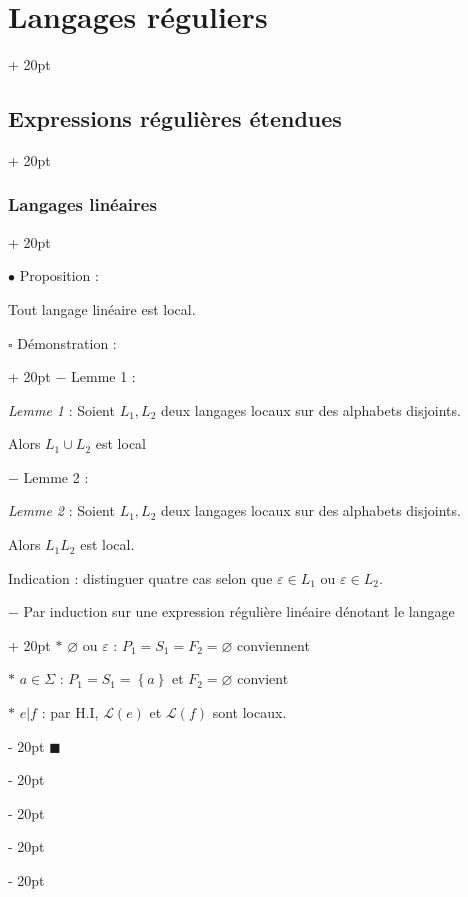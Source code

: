 \documentclass[a4paper, 12pt, twoside]{article}
\newcommand{\set}[1]{\left\{ #1 \right\}}
\newcommand{\ind}[1][20pt]{\advance\leftskip + #1}
\newcommand{\deind}[1][20pt]{\advance\leftskip - #1}
\newenvironment{indt}[2][20pt]{#2 \par \ind[#1]}{\par \deind} %
\newenvironment{proof}[1][{Démonstration :}]{\begin{indt}{$\square$ #1}}{$\blacksquare$ \end{indt}}
\begin{document}
\begin{indt}{\section{Langages réguliers}}
\begin{indt}{\subsection{Expressions régulières étendues}}
\begin{indt}{\subsubsection{Langages linéaires}}
                \vspace{12pt}
                
                $\bullet$ Proposition :
                \begin{emphBox}
                    Tout langage linéaire est local.
                \end{emphBox}

                \vspace{6pt}
                
                \begin{proof}
                    $-$ Lemme 1 :
                    \begin{emphBox}
                        \textit{Lemme 1} :
                        Soient $L_1, L_2$ deux langages locaux sur des alphabets disjoints.

                        Alors $L_1 \cup L_2$ est local
                    \end{emphBox}


                    \vspace{6pt}
                    
                    $-$ Lemme 2 :
                    \begin{emphBox}
                        \textit{Lemme 2} :
                        Soient $L_1, L_2$ deux langages locaux sur des alphabets disjoints.

                        Alors $L_1 L_2$ est local.
                    \end{emphBox}


                    Indication : distinguer quatre cas selon que $\varepsilon \in L_1$ ou $\varepsilon \in L_2$.

                    \vspace{12pt}
                    
                    \begin{indt}{$-$ Par induction sur une expression régulière linéaire dénotant le langage}
                        $*$ $\varnothing$ ou $\varepsilon$ : $P_1 = S_1 = F_2 = \varnothing$ conviennent

                        $*$ $a \in \Sigma$ : $P_1 = S_1 = \set a$ et $F_2 = \varnothing$ convient

                        $*$ $e | f$ : par H.I, $\mathcal L(e)$ et $\mathcal L(f)$ sont locaux.


\end{indt}
\end{proof}
\end{indt}
\end{indt}
\end{indt}
\end{document}
